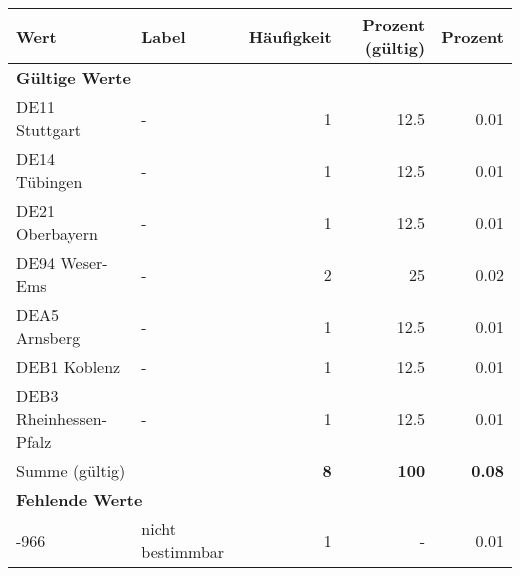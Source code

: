      \begin{longtable}{Xlrrr}
     \toprule
     \textbf{Wert} & \textbf{Label} & \textbf{Häufigkeit} & \textbf{Prozent (gültig)} & \textbf{Prozent} \\
     \endhead
     \midrule
     \multicolumn{5}{l}{\textbf{Gültige Werte}}\\

     \multicolumn{1}{X}{DE11 Stuttgart} &
     - &
     \num{1} &
     \num[round-mode=places,round-precision=2]{12.5} &
     \num[round-mode=places,round-precision=2]{0.01} \\

     \multicolumn{1}{X}{DE14 Tübingen} &
     - &
     \num{1} &
     \num[round-mode=places,round-precision=2]{12.5} &
     \num[round-mode=places,round-precision=2]{0.01} \\

     \multicolumn{1}{X}{DE21 Oberbayern} &
     - &
     \num{1} &
     \num[round-mode=places,round-precision=2]{12.5} &
     \num[round-mode=places,round-precision=2]{0.01} \\

     \multicolumn{1}{X}{DE94 Weser-Ems} &
     - &
     \num{2} &
     \num[round-mode=places,round-precision=2]{25} &
     \num[round-mode=places,round-precision=2]{0.02} \\

     \multicolumn{1}{X}{DEA5 Arnsberg} &
     - &
     \num{1} &
     \num[round-mode=places,round-precision=2]{12.5} &
     \num[round-mode=places,round-precision=2]{0.01} \\

     \multicolumn{1}{X}{DEB1 Koblenz} &
     - &
     \num{1} &
     \num[round-mode=places,round-precision=2]{12.5} &
     \num[round-mode=places,round-precision=2]{0.01} \\

     \multicolumn{1}{X}{DEB3 Rheinhessen-Pfalz} &
     - &
     \num{1} &
     \num[round-mode=places,round-precision=2]{12.5} &
     \num[round-mode=places,round-precision=2]{0.01} \\
     \midrule
      \multicolumn{2}{l}{Summe (gültig)} & \textbf{\num{8}} &
      \textbf{\num{100}} &
         \textbf{\num[round-mode=places,round-precision=2]{0.08}} \\
     \multicolumn{5}{l}{\textbf{Fehlende Werte}}\\
       -966 & nicht bestimmbar & \num{1} & - & \num[round-mode=places,round-precision=2]{0.01} \\


\end{longtable}
